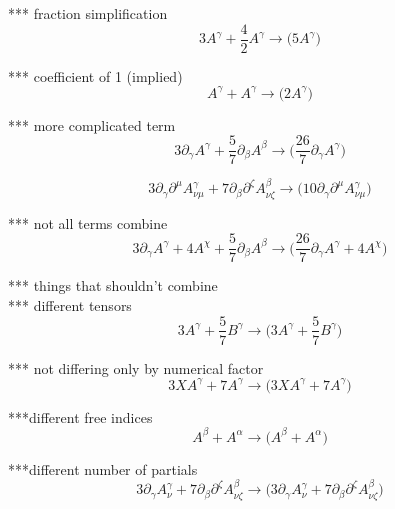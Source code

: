 \documentclass{article}
\def\){\Big)}
\def\({\Big(}
\begin{document}
{*** fraction simplification
\begin{equation}
3A^{\gamma} + \frac{4}{2} A^{\gamma}  \rightarrow 
\(5 A^{\gamma} \)
\end{equation}

*** coefficient of 1 (implied)
\begin{equation}
A^{\gamma} + A^{\gamma} \rightarrow 
\(2 A^{\gamma} \)
\end{equation}

*** more complicated term
\begin{equation}
3\partial_{\gamma}A^{\gamma} + \frac{5}{7} \partial_{\beta}A^{\beta} \rightarrow 
\(\frac{26}{7} \partial_{\gamma}A^{\gamma} \)
\end{equation}

\begin{equation}
3\partial_{\gamma}\partial^{\mu}A^{\gamma}_{\nu \mu} + 7 \partial_{\beta}\partial^{\zeta}A^{\beta}_{\nu \zeta} \rightarrow 
 \(10 \partial_{\gamma}\partial^{\mu}A_{\nu \mu}^{\gamma} \)
\end{equation}

*** not all terms combine 
\begin{equation}
3\partial_{\gamma}A^{\gamma} + 4 A^{\chi}+ \frac{5}{7} \partial_{\beta}A^{\beta} \rightarrow 
 \(\frac{26}{7} \partial_{\gamma}A^{\gamma} +4 A^{\chi} \)
\end{equation}

*** things that shouldn’t combine\\

*** different tensors
\begin{equation}
3A^{\gamma} + \frac{5}{7} B^{\gamma} \rightarrow  
\(3 A^{\gamma} +\frac{5}{7} B^{\gamma} \)
\end{equation}

*** not differing only by numerical factor
\begin{equation}
3XA^{\gamma} + 7 A^{\gamma}  \rightarrow 
\(3 X A^{\gamma} +7 A^{\gamma} \)
\end{equation}

***different free indices
\begin{equation}
A^{\beta} + A^{\alpha} \rightarrow 
\( A^{\beta} + A^{\alpha} \)
\end{equation}

***different number of partials
\begin{equation}
3\partial_{\gamma}A^{\gamma}_{\nu} + 7 \partial_{\beta}\partial^{\zeta}A^{\beta}_{\nu \zeta} \rightarrow 
\(3 \partial_{\gamma}A_{\nu}^{\gamma} +7 \partial_{\beta}\partial^{\zeta}A_{\nu \zeta}^{\beta} \)
\end{equation}

}
\end{document}
